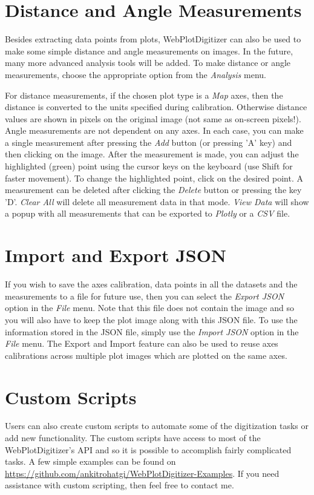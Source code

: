 \documentclass[letterpaper, 11pt]{article}
\begin{document}
\section{Distance and Angle Measurements}
Besides extracting data points from plots, WebPlotDigitizer can also be used to make some simple distance and angle measurements on images. In the future, many more advanced analysis tools will be added. To make distance or angle measurements, choose the appropriate option from the \emph{Analysis} menu.

For distance measurements, if the chosen plot type is a \emph{Map} axes, then the distance is converted to the units specified during calibration. Otherwise distance values are shown in pixels on the original image (not same as on-screen pixels!). Angle measurements are not dependent on any axes. In each case, you can make a single measurement after pressing the \emph{Add} button (or pressing 'A' key) and then clicking on the image. After the measurement is made, you can adjust the highlighted (green) point using the cursor keys on the keyboard (use Shift for faster movement). To change the highlighted point, click on the desired point. A measurement can be deleted after clicking the \emph{Delete} button or pressing the key 'D'. \emph{Clear All} will delete all measurement data in that mode. \emph{View Data} will show a popup with all measurements that can be exported to \emph{Plotly} or a \emph{CSV} file.

\section{Import and Export JSON}
\label{sec:jsonImportExport}
If you wish to save the axes calibration, data points in all the datasets and the measurements to a file for future use, then you can select the \emph{Export JSON} option in the \emph{File} menu. Note that this file does not contain the image and so you will also have to keep the plot image along with this JSON file. To use the information stored in the JSON file, simply use the \emph{Import JSON} option in the \emph{File} menu. The Export and Import feature can also be used to reuse axes calibrations across multiple plot images which are plotted on the same axes.

\section{Custom Scripts}
Users can also create custom scripts to automate some of the digitization tasks or add new functionality. The custom scripts have access to most of the WebPlotDigitizer's API and so it is possible to accomplish fairly complicated tasks. A few simple examples can be found on \url{https://github.com/ankitrohatgi/WebPlotDigitizer-Examples}. If you need assistance with custom scripting, then feel free to contact me.
\end{document}
